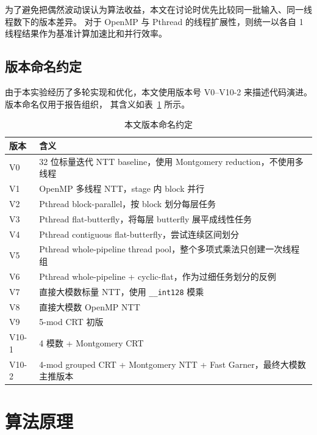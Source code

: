 \documentclass[UTF8,a4paper,10pt]{ctexart}
\begin{document}
为了避免把偶然波动误认为算法收益，本文在讨论时优先比较同一批输入、同一线程数下的版本差异。
对于 OpenMP 与 Pthread 的线程扩展性，则统一以各自 1 线程结果作为基准计算加速比和并行效率。

\subsection{版本命名约定}

由于本实验经历了多轮实现和优化，本文使用版本号 V0--V10-2 来描述代码演进。版本命名仅用于报告组织，
其含义如表~\ref{tab:version-overview} 所示。

\begin{table}[H]
  \centering
  \begin{tabular}{lp{9.8cm}}
  \toprule
  \textbf{版本} & \textbf{含义}\\
  \midrule
  V0 & 32 位标量迭代 NTT baseline，使用 Montgomery reduction，不使用多线程\\
  V1 & OpenMP 多线程 NTT，stage 内 block 并行\\
  V2 & Pthread block-parallel，按 block 划分每层任务\\
  V3 & Pthread flat-butterfly，将每层 butterfly 展平成线性任务\\
  V4 & Pthread contiguous flat-butterfly，尝试连续区间划分\\
  V5 & Pthread whole-pipeline thread pool，整个多项式乘法只创建一次线程组\\
  V6 & Pthread whole-pipeline + cyclic-flat，作为过细任务划分的反例\\
  V7 & 直接大模数标量 NTT，使用 \texttt{\_\_int128} 模乘\\
  V8 & 直接大模数 OpenMP NTT\\
  V9 & 5-mod CRT 初版\\
  V10-1 & 4 模数 + Montgomery CRT\\
  V10-2 & 4-mod grouped CRT + Montgomery NTT + Fast Garner，最终大模数主推版本\\
  \bottomrule
  \end{tabular}
  \caption{本文版本命名约定}
  \label{tab:version-overview}
\end{table}

\section{算法原理}
\end{document}
